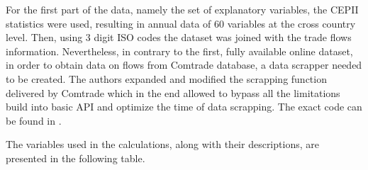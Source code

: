 \documentclass{Trade_template}
\numberwithin{equation}{section}
\begin{document}
For the first part of the data, namely the set of explanatory variables, the CEPII statistics were used, resulting in annual data of 60 variables at the cross country level. Then, using 3 digit ISO codes the dataset was joined with the trade flows information. Nevertheless, in contrary to the first, fully available online dataset, in order to obtain data on flows from Comtrade database, a data scrapper needed to be created. The authors expanded and modified the scrapping function delivered by Comtrade which in the end allowed to bypass all the limitations build into basic API and optimize the time of data scrapping. The exact code can be found in . 

The variables used in the calculations, along with their descriptions, are presented in the following table.
\end{document}
